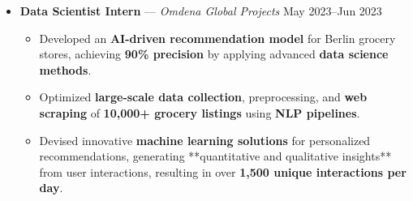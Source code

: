 \documentclass[a4paper,10pt]{article}
\begin{document}
\begin{itemize}
  \item \textbf{Data Scientist Intern} — \textit{Omdena Global Projects} \hfill May 2023–Jun 2023
  \begin{itemize}
    \item Developed an \textbf{AI-driven recommendation model} for Berlin grocery stores, achieving \textbf{90\% precision} by applying advanced \textbf{data science methods}.
    \item Optimized \textbf{large-scale data collection}, preprocessing, and \textbf{web scraping} of \textbf{10,000+ grocery listings} using \textbf{NLP pipelines}.
    \item Devised innovative \textbf{machine learning solutions} for personalized recommendations, generating **quantitative and qualitative insights** from user interactions, resulting in over \textbf{1,500 unique interactions per day}.
  \end{itemize}
\end{itemize}
\end{document}
